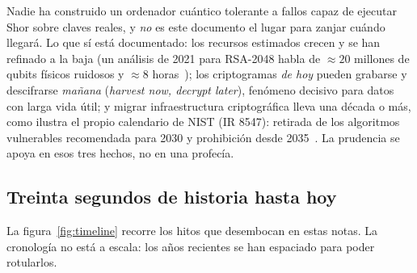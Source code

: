 \documentclass[11pt,a4paper,oneside]{report}
\begin{document}
\begin{rigor}
Nadie ha construido un ordenador cuántico tolerante a fallos capaz de
ejecutar Shor sobre claves reales, y \emph{no} es este documento el lugar
para zanjar cuándo llegará. Lo que sí está documentado: los recursos
estimados crecen y se han refinado a la baja (un análisis de 2021 para
RSA-2048 habla de $\approx 20$ millones de qubits físicos ruidosos y
$\approx 8$ horas~\cite{gidney2021}); los criptogramas \emph{de hoy} pueden
grabarse y descifrarse \emph{mañana} (\emph{harvest now, decrypt later}),
fenómeno decisivo para datos con larga vida útil; y migrar infraestructura
criptográfica lleva una década o más, como ilustra el propio calendario de
NIST (IR 8547): retirada de los algoritmos vulnerables recomendada para
2030 y prohibición desde 2035~\cite{nist8547}. La prudencia se apoya en
esos tres hechos, no en una profecía.
\end{rigor}

\subsection*{Treinta segundos de historia hasta hoy}

La figura~\ref{fig:timeline} recorre los hitos que desembocan en estas
notas. La cronología no está a escala: los años recientes se han espaciado
para poder rotularlos.
\end{document}
